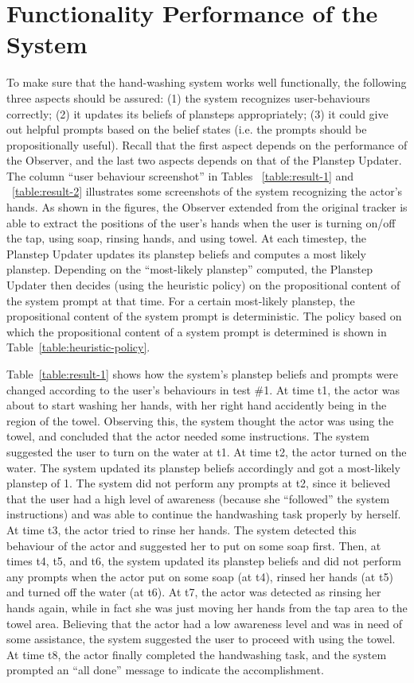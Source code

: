 \section{Functionality Performance of the System}

To make sure that the hand-washing system works well functionally, the following three aspects should be assured: (1) the system recognizes user-behaviours correctly; (2) it updates its beliefs of plansteps appropriately; (3) it could give out helpful prompts based on the belief states (i.e. the prompts should be propositionally useful). Recall that the first aspect depends on the performance of the Observer, and the last two aspects depends on that of the Planstep Updater. The column ``user behaviour screenshot'' in Tables ~\ref{table:result-1} and ~\ref{table:result-2} illustrates some screenshots of the system recognizing the actor's hands. As shown in the figures, the Observer extended from the original tracker is able to extract the positions of the user's hands when the user is turning on/off the tap, using soap, rinsing hands, and using towel. At each timestep, the Planstep Updater updates its planstep beliefs and computes a most likely planstep. Depending on the ``most-likely planstep'' computed, the Planstep Updater then decides (using the heuristic policy) on the propositional content of the system prompt at that time. For a certain most-likely planstep, the propositional content of the system prompt is deterministic. The policy based on which the propositional content of a system prompt is determined is shown in Table~\ref{table:heuristic-policy}.

Table~\ref{table:result-1} shows how the system's planstep beliefs and prompts were changed according to the user's behaviours in test \#1. At time t1, the actor was about to start washing her hands, with her right hand accidently being in the region of the towel. Observing this, the system thought the actor was using the towel, and concluded that the actor needed some instructions. The system suggested the user to turn on the water at t1. At time t2, the actor turned on the water. The system updated its planstep beliefs accordingly and got a most-likely planstep of 1. The system did not perform any prompts at t2, since it believed that the user had a high level of awareness (because she ``followed'' the system instructions) and was able to continue the handwashing task properly by herself. At time t3, the actor tried to rinse her hands. The system detected this behaviour of the actor and suggested her to put on some soap first. Then, at times t4, t5, and t6, the system updated its planstep beliefs and did not perform any prompts when the actor put on some soap (at t4), rinsed her hands (at t5) and turned off the water (at t6). At t7, the actor was detected as rinsing her hands again, while in fact she was just moving her hands from the tap area to the towel area. Believing that the actor had a low awareness level and was in need of some assistance, the system suggested the user to proceed with using the towel. At time t8, the actor finally completed the handwashing task, and the system prompted an ``all done'' message to indicate the accomplishment.


